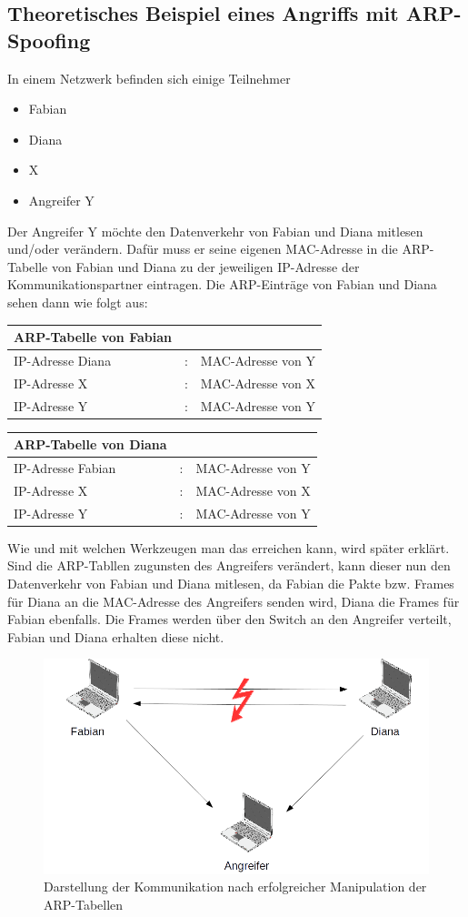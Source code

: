 \subsection{Theoretisches Beispiel eines Angriffs mit ARP-Spoofing}
In einem Netzwerk befinden sich einige Teilnehmer
\begin{itemize}
	\item Fabian
	\item Diana
	\item X
	\item Angreifer Y
\end{itemize}
Der Angreifer Y möchte den Datenverkehr von Fabian und Diana mitlesen und/oder verändern. Dafür muss er seine eigenen MAC-Adresse in die ARP-Tabelle von Fabian und Diana zu der jeweiligen IP-Adresse der Kommunikationspartner eintragen. Die ARP-Einträge von Fabian und Diana sehen dann wie folgt aus:
\vfill
\begin{tabular}{l c l}
	ARP-Tabelle von Fabian & & \\
	\hline
	IP-Adresse Diana & : & MAC-Adresse von Y \\
	IP-Adresse X & : & MAC-Adresse von X \\
	IP-Adresse Y & : & MAC-Adresse von Y \\
\end{tabular}
\vfill
\begin{tabular}{l c l}
	ARP-Tabelle von Diana & & \\
	\hline
	IP-Adresse Fabian & : & MAC-Adresse von Y \\
	IP-Adresse X & : & MAC-Adresse von X \\
	IP-Adresse Y & : & MAC-Adresse von Y \\
\end{tabular}
\vfill
Wie und mit welchen Werkzeugen man das erreichen kann, wird später erklärt.
Sind die ARP-Tabllen zugunsten des Angreifers verändert, kann dieser nun den Datenverkehr von Fabian und Diana mitlesen, da Fabian die Pakte bzw. Frames für Diana an die MAC-Adresse des Angreifers senden wird, Diana die Frames für Fabian ebenfalls. Die Frames werden über den Switch an den Angreifer verteilt, Fabian und Diana erhalten diese nicht.
\begin{figure}
	\centering
	\includegraphics[width=1\linewidth]{images/ARP-Tabelle-manipuliert.png}
	\caption{Darstellung der Kommunikation nach erfolgreicher Manipulation der ARP-Tabellen \cite{ARP-Tabelle-Bild-1}}
\end{figure}

